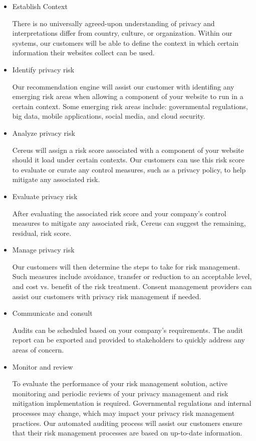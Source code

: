 \begin{itemize}

\item Establish Context

There is no universally agreed-upon understanding of privacy and interpretations differ from country, culture, or organization. Within our systems, our customers will be able to define the context in which certain information their websites collect can be used. 

\item Identify privacy risk

Our recommendation engine will assist our customer with identifing any emerging risk areas when allowing a component of your website to run in a certain context. Some emerging risk areas include: governmental regulations, big data, mobile applications, social media, and cloud security.

\item Analyze privacy risk

Cereus will assign a risk score associated with a component of your website should it load under certain contexts. Our customers can use this risk score to evaluate or curate any control measures, such as a privacy policy, to help mitigate any associated risk.

\item Evaluate privacy risk

After evaluating the associated risk score and your company's control measures to mitigate any associated risk, Cereus can suggest the remaining, residual, risk score.

\item Manage privacy risk

Our customers will then determine the steps to take for risk management. Such measures include avoidance, transfer or reduction to an acceptable level, and cost vs. benefit of the risk treatment. Consent management providers can assist our customers with privacy risk management if needed.

\item Communicate and consult

Audits can be scheduled based on your company's requirements. The audit report can be exported and provided to stakeholders to quickly address any areas of concern.

\item Monitor and review

To evaluate the performance of your risk management solution, active monitoring and periodic reviews of your privacy management and risk mitigation implementation is required. Governmental regulations and internal processes may change, which may impact your privacy risk management practices. Our automated auditing process will assist our customers ensure that their risk management processes are based on up-to-date information.

\end{itemize}

